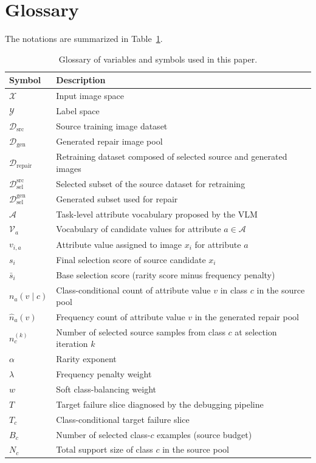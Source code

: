 \section{Glossary}
\label{app:glossary}

The notations are summarized in Table~\ref{tab:glossary}.

\begin{table}[htbp]
\centering
\caption{Glossary of variables and symbols used in this paper.}
\label{tab:glossary}
\small
\begin{tabular}{ll}
\toprule
\rowcolor{sectiongray} \textbf{Symbol} & \textbf{Description} \\
\midrule
$\mathcal{X}$ & Input image space \\
$\mathcal{Y}$ & Label space \\
$\mathcal{D}_{\mathrm{src}}$ & Source training image dataset \\
$\mathcal{D}_{\mathrm{gen}}$ & Generated repair image pool \\
$\mathcal{D}_{\mathrm{repair}}$ & Retraining dataset composed of selected source and generated images \\
$\mathcal{D}_{\mathrm{sel}}^{\mathrm{src}}$ & Selected subset of the source dataset for retraining \\
$\mathcal{D}_{\mathrm{sel}}^{\mathrm{gen}}$ & Generated subset used for repair \\
$\mathcal{A}$ & Task-level attribute vocabulary proposed by the VLM \\
$\mathcal{V}_a$ & Vocabulary of candidate values for attribute $a \in \mathcal{A}$ \\
$v_{i,a}$ & Attribute value assigned to image $x_i$ for attribute $a$ \\
$s_i$ & Final selection score of source candidate $x_i$ \\
$\bar{s}_i$ & Base selection score (rarity score minus frequency penalty) \\
$n_a(v \mid c)$ & Class-conditional count of attribute value $v$ in class $c$ in the source pool \\
$\hat{n}_a(v)$ & Frequency count of attribute value $v$ in the generated repair pool \\
$n_c^{(k)}$ & Number of selected source samples from class $c$ at selection iteration $k$ \\
$\alpha$ & Rarity exponent \\
$\lambda$ & Frequency penalty weight \\
$w$ & Soft class-balancing weight \\
$T$ & Target failure slice diagnosed by the debugging pipeline \\
$T_c$ & Class-conditional target failure slice \\
$B_c$ & Number of selected class-$c$ examples (source budget) \\
$N_c$ & Total support size of class $c$ in the source pool \\
\bottomrule
\end{tabular}
\end{table}

